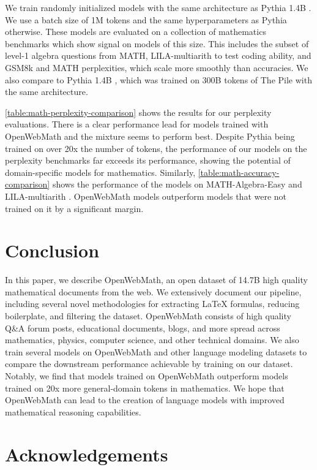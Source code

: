 We train randomly initialized models with the same architecture as Pythia 1.4B \citep{pythia}. We use a batch size of 1M tokens and the same hyperparameters as Pythia otherwise. These models are evaluated on a collection of mathematics benchmarks which show signal on models of this size. This includes the subset of level-1 algebra questions from MATH, LILA-multiarith to test coding ability, and GSM8k and MATH perplexities, which scale more smoothly than accuracies. We also compare to Pythia 1.4B \citep{pythia}, which was trained on 300B tokens of The Pile \citep{gao2020pile} with the same architecture.

\autoref{table:math-perplexity-comparison} shows the results for our perplexity evaluations. There is a clear performance lead for models trained with OpenWebMath and the mixture seems to perform best. Despite Pythia being trained on over 20x the number of tokens, the performance of our models on the perplexity benchmarks far exceeds its performance, showing the potential of domain-specific models for mathematics. Similarly, \autoref{table:math-accuracy-comparison} shows the performance of the models on MATH-Algebra-Easy and LILA-multiarith \citep{lila}. OpenWebMath models outperform models that were not trained on it by a significant margin.\section{Conclusion}

In this paper, we describe OpenWebMath, an open dataset of 14.7B high quality mathematical documents from the web. We extensively document our pipeline, including several novel methodologies for extracting \LaTeX{} formulas, reducing boilerplate, and filtering the dataset. OpenWebMath consists of high quality Q\&A forum posts, educational documents, blogs, and more spread across mathematics, physics, computer science, and other technical domains. We also train several models on OpenWebMath and other language modeling datasets to compare the downstream performance achievable by training on our dataset. Notably, we find that models trained on OpenWebMath outperform models trained on 20x more general-domain tokens in mathematics. We hope that OpenWebMath can lead to the creation of language models with improved mathematical reasoning capabilities.\newpage
\section*{Acknowledgements}

